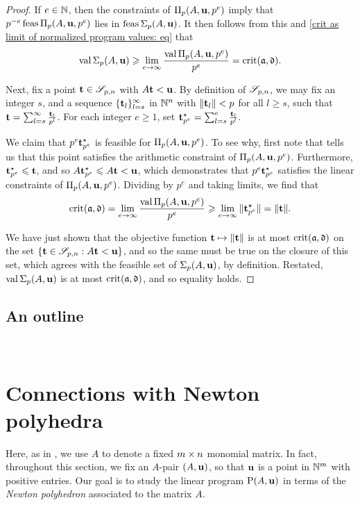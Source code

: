 \documentclass{amsart}
\begin{document}
\begin{proof}
   If $e \in \mathbb{N}$, then the constraints of $\Pi_p(A, \mathbf{u}, p^e)$ imply that $p^{-e}  \operatorname{feas} \Pi_p(A, \mathbf{u}, p^e)$ lies in $\operatorname{feas} \Sigma_p(A,\mathbf{u})$.
   It then follows from this and \eqref{crit as limit of normalized program values: eq} that
   \[
      \operatorname{val}\Sigma_p(A,\mathbf{u}) \geqslant \displaystyle \lim_{e \to \infty}\frac{\operatorname{val}\Pi_p(A,\mathbf{u}, p^e)}{p^e} = \operatorname{crit}(\mathfrak{a}, \mathfrak{d}).
   \]

   Next, fix a point $\mathbf{t} \in \mathscr{S}_{p,n}$ with $A \mathbf{t} < \mathbf{u}$.
   By definition of $\mathscr{S}_{p,n}$, we may fix an integer $s$, and a sequence $\{ \mathbf{t}_l \}_{l=s}^\infty$ in $\mathbb{N}^n$ with $\| \mathbf{t}_l \| < p$ for all $l \geq s$, such that $\mathbf{t} = \sum_{l=s}^{\infty} \frac{\mathbf{t}_l}{p^l}$.
   For each integer $e \geq 1$, set $\mathbf{t}^\star_{p^e} = \sum_{l=s}^{e} \frac{\mathbf{t}_l}{p^l}$.

   We claim that $p^e  \mathbf{t}^\star_{p^e}$ is feasible for $\Pi_p(A, \mathbf{u}, p^e)$.
   To see why, first note that  tells us that this point satisfies the arithmetic constraint of $\Pi_p(A, \mathbf{u}, p^e)$.
   Furthermore, $\mathbf{t}^{\star}_{p^e} \leqslant \mathbf{t}$, and so $A \mathbf{t}^{\star}_{p^e} \leqslant A \mathbf{t} < \mathbf{u}$, which demonstrates that $p^e \mathbf{t}^\star_{p^e}$ satisfies the linear constraints of $\Pi_p(A, \mathbf{u}, p^e)$.
   Dividing by $p^e$ and taking limits, we find that
   \[
      \operatorname{crit}(\mathfrak{a}, \mathfrak{d}) = \lim_{e \to \infty} \frac{\operatorname{val} \Pi_p(A, \mathbf{u}, p^e)}{p^e} \geqslant \lim_{e \to \infty}   \| \mathbf{t}^\star_{p^e} \| = \| \mathbf{t} \|.
   \]

   We have just shown that the objective function $\mathbf{t} \mapsto \| \mathbf{t} \|$ is at most $\operatorname{crit}(\mathfrak{a}, \mathfrak{d})$ on the set $\{ \mathbf{t} \in \mathscr{S}_{p,n} : A \mathbf{t} < \mathbf{u} \}$, and so the same must be true on the closure of this set, which agrees with the feasible set of $\Sigma_p(A, \mathbf{u})$, by definition.
   Restated,  $ \operatorname{val} \Sigma_p(A, \mathbf{u})$ is at most $\operatorname{crit}(\mathfrak{a},  \mathfrak{d})$, and so equality holds.
\end{proof}

\subsection{An outline}

\ 

\section{Connections with Newton polyhedra}
\label{s: newton}
Here, as in ,  we use $A$ to denote a fixed $m \times n$ monomial matrix.
In fact, throughout this section, we fix an $A$-pair $(A, \mathbf{u})$, so that $\mathbf{u}$ is a point in $\mathbb{N}^m$ with positive entries.
Our goal is to study the linear program $\mathrm{P}(A, \mathbf{u})$ in terms of the \emph{Newton polyhedron} associated to the matrix $A$.
\end{document}
